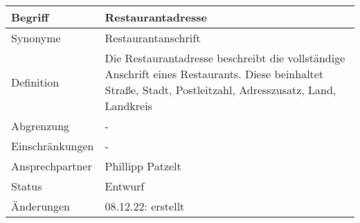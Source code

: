 \begin{table}[H]
    \centering
    \label{gls:restaurant}
    \begin{tabularx}{\textwidth}{| l | X |}
        \hline
        Begriff         & Restaurantadresse                                                                                                                                          \\
        \hline
        Synonyme        &  Restaurantanschrift                                                                                                                                                          \\
        \hline
        Definition      & Die Restaurantadresse beschreibt die vollständige Anschrift eines Restaurants. Diese beinhaltet Straße, Stadt, Postleitzahl, Adresszusatz, Land, Landkreis \\
        \hline
        Abgrenzung      & -                                                                                                                                                          \\
        \hline
        Einschränkungen & -                                                                                                                                                          \\
        \hline
        Ansprechpartner & Phillipp Patzelt                                                                                                                                           \\
        \hline
        Status          & Entwurf                                                                                                                                                    \\
        \hline
        Änderungen      & 08.12.22: erstellt                                                                                                                                         \\
        \hline
    \end{tabularx}
\end{table}

